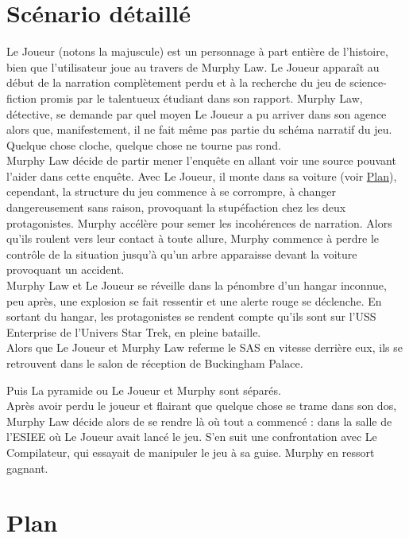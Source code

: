 \documentclass[a4paper,12pt]{report}
\begin{document}
\section{Scénario détaillé}

Le Joueur (notons la majuscule) est un personnage à part entière de l'histoire, bien que l'utilisateur joue au travers de Murphy Law. Le Joueur apparaît au début de la narration complètement perdu et à la recherche du jeu de science-fiction promis par le talentueux étudiant dans son rapport. Murphy Law, détective, se demande par quel moyen Le Joueur a pu arriver dans son agence alors que, manifestement, il ne fait même pas partie du schéma narratif du jeu. Quelque chose cloche, quelque chose ne tourne pas rond.\\

Murphy Law décide de partir mener l'enquête en allant voir une source pouvant l'aider dans cette enquête. Avec Le Joueur, il monte dans sa voiture (voir \hyperlink{section.1.5}{Plan}), cependant, la structure du jeu commence à se corrompre, à changer dangereusement sans raison, provoquant la stupéfaction chez les deux protagonistes. Murphy accélère pour semer les incohérences de narration. Alors qu'ils roulent vers leur contact à toute allure, Murphy commence à perdre le contrôle de la situation jusqu'à qu'un arbre apparaisse devant la voiture provoquant un accident.\\

Murphy Law et Le Joueur se réveille dans la pénombre d'un hangar inconnue, peu après, une explosion se fait ressentir et une alerte rouge se déclenche. En sortant du hangar, les protagonistes se rendent compte qu'ils sont sur l'USS Enterprise de l'Univers Star Trek, en pleine bataille.\\

Alors que Le Joueur et Murphy Law referme le SAS en vitesse derrière eux, ils se retrouvent dans le salon de réception de Buckingham Palace. 

Puis La pyramide ou Le Joueur et Murphy sont séparés.\\

Après avoir perdu le joueur et flairant que quelque chose se trame dans son dos, Murphy Law décide alors de se rendre là où tout a commencé : dans la salle de l'ESIEE où Le Joueur avait lancé le jeu. S'en suit une confrontation avec Le Compilateur, qui essayait de manipuler le jeu à sa guise. Murphy en ressort gagnant.\\

\section{Plan}
\end{document}
